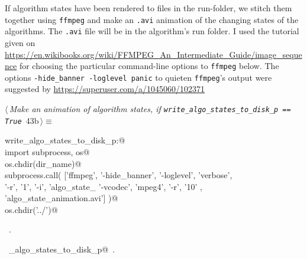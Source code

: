 \documentclass[11.5pt]{report}
\begin{document}
\vspace{-0.8cm}\newchunk If algorithm states have been rendered to files in the run-folder, we stitch them together using \verb|ffmpeg|
and make an \verb|.avi| animation of the changing states of the algorithms. The \verb|.avi| file will be in the algorithm's
run folder. I used the  tutorial given on \url{https://en.wikibooks.org/wiki/FFMPEG_An_Intermediate_Guide/image_sequence}
for choosing the particular command-line options to \verb|ffmpeg| below. The options \texttt{-hide\_banner -loglevel panic} 
to quieten \verb|ffmpeg|'s output were suggested by  \url{https://superuser.com/a/1045060/102371} 


\begin{flushleft} \small\label{scrap61}\raggedright\small
{} $\langle\,${\itshape Make an animation of algorithm states, if \verb|write_algo_states_to_disk_p == True|}\nobreak\ {\footnotesize {43b}}$\,\rangle\equiv$
\vspace{-1ex}
\begin{list}{}{} \item
\mbox{}\verb@if write_algo_states_to_disk_p:@\\
\mbox{}\verb@     import subprocess, os@\\
\mbox{}\verb@     os.chdir(dir_name)@\\
\mbox{}\verb@     subprocess.call( ['ffmpeg',  '-hide_banner', '-loglevel', 'verbose', \@\\
\mbox{}\verb@                       '-r', '1',  '-i', 'algo_state_%05d.png', \@\\
\mbox{}\verb@                       '-vcodec', 'mpeg4', '-r', '10' , \@\\
\mbox{}\verb@                       'algo_state_animation.avi']  )@\\
\mbox{}\verb@     os.chdir('../')@\\
\mbox{}\verb@@{\NWsep}
\end{list}
\vspace{-1.5ex}
\footnotesize
\begin{list}{}{\setlength{\itemsep}{-\parsep}\setlength{\itemindent}{-\leftmargin}}
\item \NWtxtMacroRefIn\ .
\item \NWtxtIdentsUsed\nobreak\  \verb@write_algo_states_to_disk_p@\nobreak\ .
\item{}
\end{list}
\vspace{4ex}
\end{flushleft}
\end{document}
